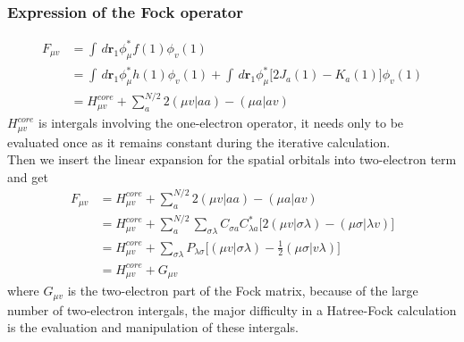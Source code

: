 \documentclass[11pt]{article}
\begin{document}
\subsubsection{Expression of the Fock operator}
\begin{equation}
    \begin{split}
        F_{\mu v}&=\int\,d\mathbf{r}_1\phi_\mu^*f(1)\phi_v(1)\\
        &=\int\,d\mathbf{r}_1\phi_\mu^*h(1)\phi_v(1)+\int\,d\mathbf{r}_1\phi_\mu^*\big[2J_a(1)-K_a(1)\big]\phi_v(1)\\
        &=H_{\mu v}^{core}+\sum_{a}^{N/2}2(\mu v|aa)-(\mu a|av)
    \end{split}
\end{equation}
$H_{\mu v}^{core}$ is intergals involving the one-electron operator, it needs only to be evaluated once as it remains constant
during the iterative calculation.\\
Then we insert the linear expansion for the spatial orbitals into two-electron term and get
\begin{equation}
    \begin{split}
        F_{\mu v}&=H_{\mu v}^{core}+\sum_{a}^{N/2}2(\mu v|aa)-(\mu a|av)\\
        &=H_{\mu v}^{core}+\sum_{a}^{N/2}\sum_{\sigma\lambda}C_{\sigma a}C_{\lambda a}^*\big[2(\mu v|\sigma\lambda)-(\mu \sigma|\lambda v)\big]\\
        &=H_{\mu v}^{core}+\sum_{\sigma\lambda}P_{\lambda\sigma}\big[(\mu v|\sigma\lambda)-\frac{1}{2}(\mu \sigma|v\lambda)\big]\\
        &=H_{\mu v}^{core}+G_{\mu v}
    \end{split}
\end{equation}
where $G_{\mu v}$ is the two-electron part of the Fock matrix, because of the large number of two-electron intergals, the major
difficulty in a Hatree-Fock calculation is the evaluation and manipulation of these intergals.
\end{document}
